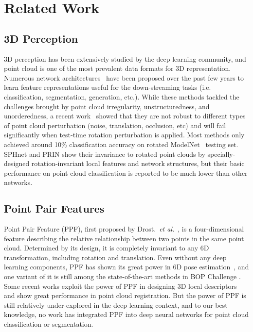 \documentclass{article}
\newcommand{\etal}{\textit{et al.}}
\begin{document}
\section{Related Work}

\subsection{3D Perception}

3D perception has been extensively studied by the deep learning community, and point cloud is one of the most prevalent data formats for 3D representation. Numerous network architectures~\cite{Qi2017pointnet, qi2017pointnet2, Wang2019-dgcnn, Li2018-PointCNN, Wu2019-pointconv, Liu2019-densepoint} have been proposed over the past few years to learn feature representations useful for the down-streaming tasks (i.e. classification, segmentation, generation, etc.). While these methods tackled the challenges brought by point cloud irregularity, unstructuredness, and unorderedness, a recent work~\cite{taghanaki2020robustpointset} showed that they are not robust to different types of point cloud perturbation (noise, translation, occlusion, etc) and will fail significantly when test-time rotation perturbation is applied. Most methods only achieved around 10\% classification accuracy on rotated ModelNet~\cite{Wu2015-3dshapenet} testing set. 
SPHnet \cite{Poulenard2019-sphnet} and PRIN \cite{You2021-prin} show their invariance to rotated point clouds by specially-designed rotation-invariant local features and network structures, but their basic performance on point cloud classification is reported to be much lower than other networks. 


\subsection{Point Pair Features}

Point Pair Feature (PPF), first proposed by Drost.~\etal~\cite{Drost2010-ppf}, is a four-dimensional feature describing the relative relationship between two points in the same point cloud. Determined by its design, it is completely invariant to any 6D transformation, including rotation and translation. Even without any deep learning components, PPF has shown its great power in 6D pose estimation~\cite{Eunyoung_Kim2011-3dobject, Birdal2015-ppfbased, Hinterstoisser2016-goingfurther, Kiforenko2018-ppfeval}, and one variant of it \cite{Vidal2018-rh} is still among the state-of-the-art methods in BOP Challenge \cite{Hodan2018-bop}. Some recent works \cite{Deng2018-PPFNet, Deng2018-PPFFoldNet} exploit the power of PPF in designing 3D local descriptors and show great performance in point cloud registration. But the power of PPF is still relatively under-explored in the deep learning context, and to our best knowledge, no work has integrated PPF into deep neural networks for point cloud classification or segmentation. 
\end{document}
